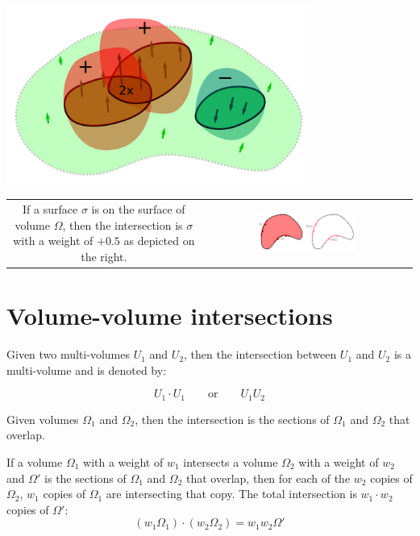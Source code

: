 \documentclass{book}
\begin{document}
\begin{center}
\includegraphics[width = 0.75\textwidth]{Intersections/Surface-volume_intersections/surface_volume_intersections_example_3}
\end{center}

\begin{tabular}{cc}
\parbox{0.5\textwidth}{
If a surface \(\sigma\) is on the surface of volume \(\Omega\), then the intersection is \(\sigma\) with a weight of \(+0.5\) as depicted on the right.
} & \parbox{0.5\textwidth}{
\includegraphics[width = 0.5\textwidth]{Intersections/Surface-volume_intersections/surface_volume_intersection_boundary_case}
}
\end{tabular}





\section{Volume-volume intersections}

Given two multi-volumes \(U_1\) and \(U_2\), then the intersection between \(U_1\) and \(U_2\) is a multi-volume and is denoted by:

\[U_1 \cdot U_1 \quad\quad\text{or}\quad\quad U_1 U_2\]

Given volumes \(\Omega_1\) and \(\Omega_2\), then the intersection is the sections of \(\Omega_1\) and \(\Omega_2\) that overlap. 

If a volume \(\Omega_1\) with a weight of \(w_1\) intersects a volume \(\Omega_2\) with a weight of \(w_2\) and \(\Omega'\) is the sections of \(\Omega_1\) and \(\Omega_2\) that overlap, then for each of the \(w_2\) copies of \(\Omega_2\), \(w_1\) copies of \(\Omega_1\) are intersecting that copy. The total intersection is \(w_1 \cdot w_2\) copies of \(\Omega'\):
\[(w_1\Omega_1) \cdot (w_2\Omega_2) = w_1 w_2 \Omega'\] 
\end{document}
